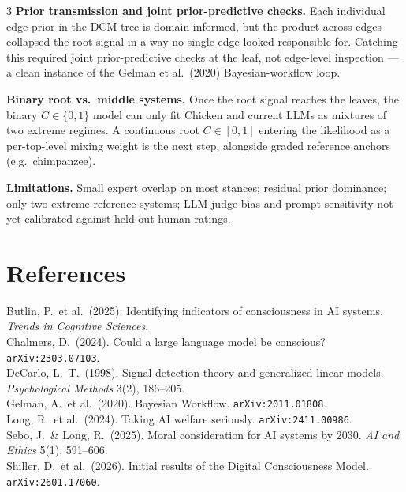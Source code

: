\documentclass[a0,portrait]{a0poster}
\begin{document}
\begin{multicols}{3}
\textbf{Prior transmission and joint prior-predictive checks.} Each individual edge prior in the DCM tree is domain-informed, but the product across edges collapsed the root signal in a way no single edge looked responsible for. Catching this required joint prior-predictive checks at the leaf, not edge-level inspection --- a clean instance of the Gelman et al.\ (2020) Bayesian-workflow loop.

\textbf{Binary root vs.\ middle systems.} Once the root signal reaches the leaves, the binary $C\in\{0,1\}$ model can only fit Chicken and current LLMs as mixtures of two extreme regimes. A continuous root $C\in[0,1]$ entering the likelihood as a per-top-level mixing weight is the next step, alongside graded reference anchors (e.g.\ chimpanzee).

\textbf{Limitations.} Small expert overlap on most stances; residual prior dominance; only two extreme reference systems; LLM-judge bias and prompt sensitivity not yet calibrated against held-out human ratings.

\color{Black}


\section*{\color{PosterGreen} References}

\small
\noindent Butlin, P.\ et al.\ (2025). Identifying indicators of consciousness in AI systems. \textit{Trends in Cognitive Sciences}.\\
Chalmers, D.\ (2024). Could a large language model be conscious? \texttt{arXiv:2303.07103}.\\
DeCarlo, L.\ T.\ (1998). Signal detection theory and generalized linear models. \textit{Psychological Methods} 3(2), 186--205.\\
Gelman, A.\ et al.\ (2020). Bayesian Workflow. \texttt{arXiv:2011.01808}.\\
Long, R.\ et al.\ (2024). Taking AI welfare seriously. \texttt{arXiv:2411.00986}.\\
Sebo, J.\ \& Long, R.\ (2025). Moral consideration for AI systems by 2030. \textit{AI and Ethics} 5(1), 591--606.\\
Shiller, D.\ et al.\ (2026). Initial results of the Digital Consciousness Model. \texttt{arXiv:2601.17060}.

\end{multicols}
\end{document}
